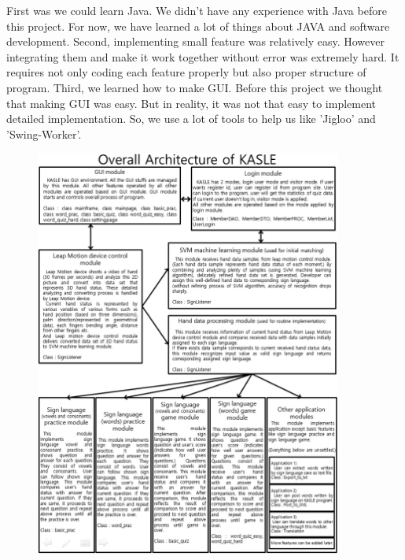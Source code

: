 \documentclass[10pt,journal,compsoc]{IEEEtran}
\begin{document}
First was we could learn Java. We didn’t have any experience with Java before this project. For now, we have learned a lot of things about JAVA and software development.
Second, implementing small feature was relatively easy. However integrating them and make it work together without error was extremely hard. It requires not only coding each feature properly but also proper structure of program.
Third, we learned how to make GUI. Before this project we thought that making GUI was easy. But in reality, it was not that easy to implement detailed implementation. So, we use a lot of tools to help us like 'Jigloo' and 'Swing-Worker'.
\clearpage
\begin{figure}[H]

\includegraphics[width=0.9\textwidth]{My.png}
\caption{}
\end{figure}
\end{document}
